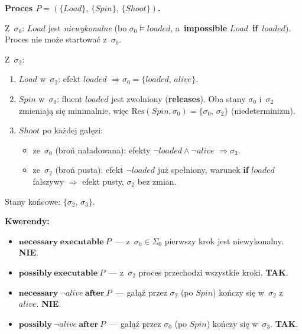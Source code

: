 \documentclass[11pt,a4paper]{article}
\newcommand{\aft}{\textbf{after}}
\renewcommand{\iff}{\textbf{if}}
\newcommand{\impossible}{\textbf{impossible}}
\newcommand{\releases}{\textbf{releases}}
\newcommand{\necessary}{\textbf{necessary}}
\newcommand{\possibly}{\textbf{possibly}}
\newcommand{\executable}{\textbf{executable}}
\theoremstyle{definition}
\begin{document}
\medskip
\noindent\textbf{Proces $P = (\{\mathit{Load}\},\, \{\mathit{Spin}\},\, \{\mathit{Shoot}\})$.}

\smallskip
Z~$\sigma_0$: $\mathit{Load}$ jest \emph{niewykonalne}
(bo $\sigma_0 \models \mathit{loaded}$, a~\impossible{} $\mathit{Load}$~\iff{}~$\mathit{loaded}$).
Proces nie może startować z~$\sigma_0$.

\smallskip\noindent
Z~$\sigma_2$:
\begin{enumerate}
  \item $\mathit{Load}$ w~$\sigma_2$: efekt $\mathit{loaded}$
        $\Rightarrow \sigma_0 = \{\mathit{loaded},\,\mathit{alive}\}$.
  \item $\mathit{Spin}$ w~$\sigma_0$: fluent $\mathit{loaded}$ jest zwolniony
        (\releases{}).
        Oba stany $\sigma_0$ i~$\sigma_2$ zmieniają się minimalnie,
        więc $\mathrm{Res}(\mathit{Spin}, \sigma_0) = \{\sigma_0,\, \sigma_2\}$
        (niedeterminizm).
  \item $\mathit{Shoot}$ po każdej gałęzi:
    \begin{itemize}
      \item ze~$\sigma_0$ (broń naładowana):
            efekty $\neg\mathit{loaded} \land \neg\mathit{alive}$
            $\Rightarrow \sigma_3$.
      \item ze~$\sigma_2$ (broń pusta):
            efekt $\neg\mathit{loaded}$ już spełniony,
            warunek \iff{} $\mathit{loaded}$ fałszywy
            $\Rightarrow$ efekt pusty, $\sigma_2$ bez zmian.
    \end{itemize}
\end{enumerate}

Stany końcowe: $\{\sigma_2,\, \sigma_3\}$.

\medskip
\noindent\textbf{Kwerendy:}
\begin{itemize}
  \item $\necessary\ \executable\ P$~---
    z~$\sigma_0 \in \Sigma_0$ pierwszy krok jest niewykonalny.
    \textbf{NIE}.

  \item $\possibly\ \executable\ P$~---
    z~$\sigma_2$ proces przechodzi wszystkie kroki.
    \textbf{TAK}.

  \item $\necessary\ \neg\mathit{alive}\ \aft\ P$~---
    gałąź przez $\sigma_2$ (po $\mathit{Spin}$) kończy się w~$\sigma_2$
    z~$\mathit{alive}$.
    \textbf{NIE}.

  \item $\possibly\ \neg\mathit{alive}\ \aft\ P$~---
    gałąź przez $\sigma_0$ (po $\mathit{Spin}$) kończy się w~$\sigma_3$.
    \textbf{TAK}.
\end{itemize}
\end{document}
